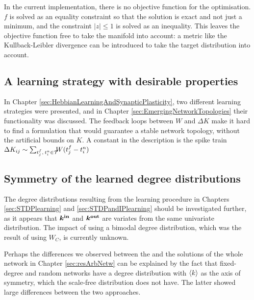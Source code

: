 In the current implementation, there is no objective function for the optimisation. $f$ is solved as an equality constraint so that the solution is exact and not just a minimum, and the constraint $| z | \leq 1$ is solved as an inequality. This leaves the objective function free to take the manifold into account: a metric like the Kullback-Leibler divergence can be introduced to take the target distribution into account. 


\subsection{A learning strategy with desirable properties}
In Chapter \ref{sec:HebbianLearningAndSynapticPlasticity}, two different learning strategies were presented, and in Chapter \ref{sec:EmergingNetworkTopologies} their functionality was discussed. The feedback loops between $W$ and $\Delta K$ make it hard to find a formulation that would guarantee a stable network topology, without the artificial bounds on $K$.
A constant in the description is the spike train $\Delta K_{ij} \sim \sum_{t_{j}^{f}, \: t_i^{n} \in \mathcal{T}} \hspace{-2mm} W (t_{j}^{f}-t_i^{n} )$

\subsection{Symmetry of the learned degree distributions}
The degree distributions resulting from the learning procedure in Chapters \ref{sec:STDPlearning} and \ref{sec:STDPandIPlearning} should be investigated further, as it appears that ${\boldsymbol{k^{\rm in}}}$ and $\boldsymbol{{k^{\rm out}}}$ are variates from the same univariate distribution. The impact of using a bimodal degree distribution, which was the result of using $W_C$, is currently unknown.

Perhaps the differences we observed between the \MFR and the solutions of the whole network in Chapter \ref{sec:resArbNetw} can be explained by the fact that fixed-degree and random networks have a degree distribution with ${\langle k\rangle}$ as the axis of symmetry, which the scale-free distribution does not have. The latter showed large differences between the two approaches.


